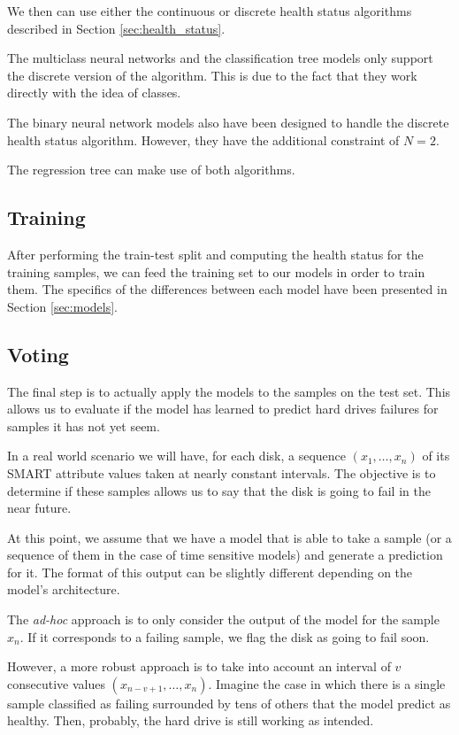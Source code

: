 We then can use either the continuous or discrete health status algorithms described in Section \ref{sec:health_status}.

The multiclass neural networks and the classification tree models only support the discrete version of the algorithm.
This is due to the fact that they work directly with the idea of classes.

The binary neural network models also have been designed to handle the discrete health status algorithm.
However, they have the additional constraint of $N = 2$.

The regression tree can make use of both algorithms.

\subsection{Training}

After performing the train-test split and computing the health status for the training samples, we can feed the training set to our models in order to train them.
The specifics of the differences between each model have been presented in Section \ref{sec:models}.

\subsection{Voting}\label{subsec:voting}

The final step is to actually apply the models to the samples on the test set.
This allows us to evaluate if the model has learned to predict hard drives failures for samples it has not yet seem.

In a real world scenario we will have, for each disk, a sequence $(x_1,\dots,x_n)$ of its SMART attribute values taken at nearly constant intervals.
The objective is to determine if these samples allows us to say that the disk is going to fail in the near future.

At this point, we assume that we have a model that is able to take a sample (or a sequence of them in the case of time sensitive models) and generate a prediction for it.
The format of this output can be slightly different depending on the model's architecture.

The \textit{ad-hoc} approach is to only consider the output of the model for the sample $x_n$.
If it corresponds to a failing sample, we flag the disk as going to fail soon.

However, a more robust approach is to take into account an interval of $v$ consecutive values $(x_{n-v+1},\dots,x_n)$.
Imagine the case in which there is a single sample classified as failing surrounded by tens of others that the model predict as healthy.
Then, probably, the hard drive is still working as intended.

